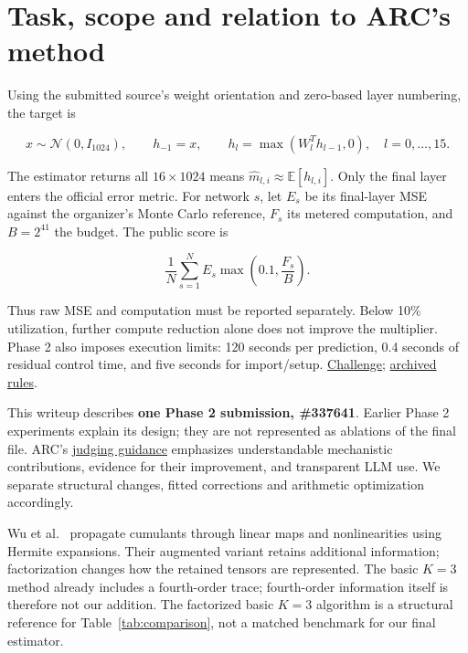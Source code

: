\documentclass[11pt,letterpaper]{article}
\begin{document}
\section{Task, scope and relation to ARC's method}\label{task-scope-and-relation-to-arcs-method}

Using the submitted source's weight orientation and zero-based layer numbering, the target is

\begin{equation}
x\sim\mathcal N(0,I_{1024}),\qquad h_{-1}=x,\qquad
h_l=\max(W_l^T h_{l-1},0),\quad l=0,\ldots,15.
\end{equation}

The estimator returns all \(16\times1024\) means \(\widehat m_{l,i}\approx\mathbb E[h_{l,i}]\). Only the final layer enters the official error metric. For network \(s\), let \(E_s\) be its final-layer MSE against the organizer's Monte Carlo reference, \(F_s\) its metered computation, and \(B=2^{41}\) the budget. The public score is

\begin{equation}
\frac{1}{N}\sum_{s=1}^{N}E_s\max\!\left(0.1,\frac{F_s}{B}\right).
\end{equation}

Thus raw MSE and computation must be reported separately. Below 10\% utilization, further compute reduction alone does not improve the multiplier. Phase 2 also imposes execution limits: 120 seconds per prediction, 0.4 seconds of residual control time, and five seconds for import/setup. \href{https://www.aicrowd.com/challenges/arc-white-box-estimation-challenge-2026}{Challenge}; \href{https://github.com/mattliston/arc-whitebox-estimation-challenge/blob/main/records/OFFICIAL_RULES_VERBATIM_PASTE_20261021.md\#L163}{archived rules}.

This writeup describes \textbf{one Phase 2 submission, \#337641}. Earlier Phase 2 experiments explain its design; they are not represented as ablations of the final file. ARC's \href{https://discourse.aicrowd.com/t/algorithmic-contribution-prize-guidelines-how-arc-judges-these-prizes-discretion-technical-writeups-llm-usage/18041}{judging guidance} emphasizes understandable mechanistic contributions, evidence for their improvement, and transparent LLM use. We separate structural changes, fitted corrections and arithmetic optimization accordingly.

Wu et al.~\cite{ref-wu} propagate cumulants through linear maps and nonlinearities using Hermite expansions. Their augmented variant retains additional information; factorization changes how the retained tensors are represented. The basic \(K=3\) method already includes a fourth-order trace; fourth-order information itself is therefore not our addition. The factorized basic \(K=3\) algorithm is a structural reference for Table~\ref{tab:comparison}, not a matched benchmark for our final estimator.
\end{document}

